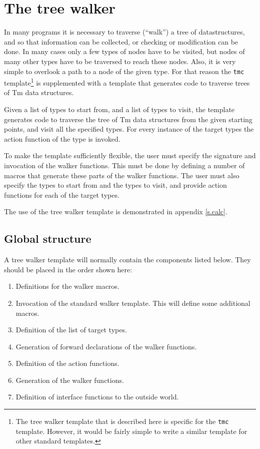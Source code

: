 \section{The tree walker}
\label{s.treewalk}
In many programs it is necessary to traverse (``walk'') a tree of
datastructures, and so that information can be collected, or checking
or modification can be done. In many cases only a few types of nodes
have to be visited, but nodes of many other types have to be traversed
to reach these nodes. Also, it is very simple to overlook a path to a node
of the given type. For that reason the \verb'tmc' template\footnote{The
tree walker template that is described here is specific for the {\tt tmc}
template. However, it would be fairly simple to write a similar template
for other standard templates.} is supplemented with a template that
generates code to traverse trees of Tm data structures.

Given a list of types to start from, and a list of types to visit,
the template generates code to traverse the tree of Tm data structures
from the given starting points, and visit all the specified types.
For every instance of the target types the action function of the
type is invoked.

To make the template sufficiently flexible, the user must specify
the signature and invocation of the walker functions. This must be
done by defining a number of macros that generate these parts of
the walker functions. The user must also specify the types to
start from and the types to visit, and provide action functions for
each of the target types.

The use of the tree walker template is demonstrated in appendix \ref{s.calc}.

\subsection{Global structure}
A tree walker template will normally contain the components listed below.
They should be placed in the order shown here:
\begin{enumerate}
\item Definitions for the walker macros.
\item Invocation of the standard walker template. This will define some
 additional macros.
\item Definition of the list of target types.
\item Generation of forward declarations of the walker functions.
\item Definition of the action functions.
\item Generation of the walker functions.
\item Definition of interface functions to the outside world.
\end{enumerate}
